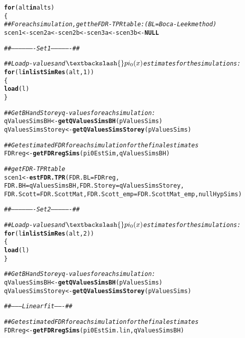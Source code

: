 \documentclass{article}\usepackage[]{graphicx}\usepackage[]{color}
\makeatletter
\newcommand{\hlnum}[1]{\textcolor[rgb]{0.686,0.059,0.569}{#1}}%
\newcommand{\hlcom}[1]{\textcolor[rgb]{0.678,0.584,0.686}{\textit{#1}}}%
\newcommand{\hlstd}[1]{\textcolor[rgb]{0.345,0.345,0.345}{#1}}%
\newcommand{\hlkwa}[1]{\textcolor[rgb]{0.161,0.373,0.58}{\textbf{#1}}}%
\newcommand{\hlkwb}[1]{\textcolor[rgb]{0.69,0.353,0.396}{#1}}%
\newcommand{\hlkwc}[1]{\textcolor[rgb]{0.333,0.667,0.333}{#1}}%
\newcommand{\hlkwd}[1]{\textcolor[rgb]{0.737,0.353,0.396}{\textbf{#1}}}%
\newenvironment{kframe}{%
 \def\at@end@of@kframe{}%
 \ifinner\ifhmode%
  \def\at@end@of@kframe{\end{minipage}}%
  \begin{minipage}{\columnwidth}%
 \fi\fi%
 \def\FrameCommand##1{\hskip\@totalleftmargin \hskip-\fboxsep
 \colorbox{shadecolor}{##1}\hskip-\fboxsep
     \hskip-\linewidth \hskip-\@totalleftmargin \hskip\columnwidth}%
 \MakeFramed {\advance\hsize-\width
   \@totalleftmargin\z@ \linewidth\hsize
   \@setminipage}}%
 {\par\unskip\endMakeFramed%
 \at@end@of@kframe}
\newenvironment{knitrout}{}{} %
\makeatother
\begin{document}
\begin{knitrout}
\color{fgcolor}\begin{kframe}
\begin{alltt}
\hlkwa{for}\hlstd{(alt} \hlkwa{in} \hlstd{alts)}
\hlstd{\{}
  \hlcom{##For each simulation, get the FDR-TPR table: (BL = Boca-Leek method)}
  \hlstd{scen1} \hlkwb{<-} \hlstd{scen2a} \hlkwb{<-} \hlstd{scen2b} \hlkwb{<-} \hlstd{scen3a} \hlkwb{<-} \hlstd{scen3b} \hlkwb{<-} \hlkwa{NULL}

  \hlcom{##-------------------Set 1----------------##}

  \hlcom{##Load p-values and $\textbackslash{}pi_0(x)$ estimates for the simulations:}
  \hlkwa{for}\hlstd{(l} \hlkwa{in} \hlkwd{listSimRes}\hlstd{(alt,} \hlnum{1}\hlstd{))}
  \hlstd{\{}
    \hlkwd{load}\hlstd{(l)}
  \hlstd{\}}

  \hlcom{##Get BH and Storey q-values for each simulation:}
  \hlstd{qValuesSimsBH} \hlkwb{<-} \hlkwd{getQValuesSimsBH}\hlstd{(pValuesSims)}
  \hlstd{qValuesSimsStorey} \hlkwb{<-} \hlkwd{getQValuesSimsStorey}\hlstd{(pValuesSims)}

  \hlcom{##Get estimated FDR for each simulation for the final estimates}
  \hlstd{FDRreg} \hlkwb{<-} \hlkwd{getFDRregSims}\hlstd{(pi0EstSim, qValuesSimsBH)}

  \hlcom{##get FDR-TPR table}
  \hlstd{scen1} \hlkwb{<-} \hlkwd{estFDR.TPR}\hlstd{(}\hlkwc{FDR.BL} \hlstd{= FDRreg,}
                      \hlkwc{FDR.BH} \hlstd{= qValuesSimsBH,} \hlkwc{FDR.Storey} \hlstd{= qValuesSimsStorey,}
                      \hlkwc{FDR.Scott} \hlstd{= FDR.ScottMat,} \hlkwc{FDR.Scott_emp} \hlstd{= FDR.ScottMat_emp, nullHypSims)}

  \hlcom{##-------------------Set 2----------------##}

  \hlcom{##Load p-values and $\textbackslash{}pi_0(x)$ estimates for the simulations:}
  \hlkwa{for}\hlstd{(l} \hlkwa{in} \hlkwd{listSimRes}\hlstd{(alt,} \hlnum{2}\hlstd{))}
  \hlstd{\{}
    \hlkwd{load}\hlstd{(l)}
  \hlstd{\}}

  \hlcom{##Get BH and Storey q-values for each simulation:}
  \hlstd{qValuesSimsBH} \hlkwb{<-} \hlkwd{getQValuesSimsBH}\hlstd{(pValuesSims)}
  \hlstd{qValuesSimsStorey} \hlkwb{<-} \hlkwd{getQValuesSimsStorey}\hlstd{(pValuesSims)}

  \hlcom{##--------Linear fit-------##}

  \hlcom{##Get estimated FDR for each simulation for the final estimates}
  \hlstd{FDRreg} \hlkwb{<-} \hlkwd{getFDRregSims}\hlstd{(pi0EstSim.lin, qValuesSimsBH)}


\end{alltt}
\end{kframe}
\end{knitrout}
\end{document}
